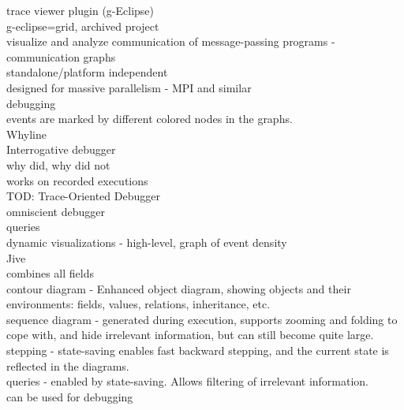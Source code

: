 trace viewer plugin (g-Eclipse)\\
	g-eclipse=grid, archived project\\
	visualize and analyze communication of message-passing programs - communication graphs\\
	standalone/platform independent\\
	designed for massive parallelism - MPI and similar\\
	debugging\\
	events are marked by different colored nodes in the graphs.\\

Whyline\\
	Interrogative debugger\\
	why did, why did not\\
	works on recorded executions\\

TOD: Trace-Oriented Debugger\\
	omniscient debugger\\
	queries\\
	dynamic visualizations - high-level, graph of event density\\

Jive\\
	combines all fields\\
	contour diagram - Enhanced object diagram, showing objects and their environments: fields, values, relations, inheritance, etc.\\
	sequence diagram - generated during execution, supports zooming and folding to cope with, and hide irrelevant information, but can still become quite large.\\
	stepping - state-saving enables fast backward stepping, and the current state is reflected in the diagrams.\\
	queries - enabled by state-saving. Allows filtering of irrelevant information.\\
	can be used for debugging\\




